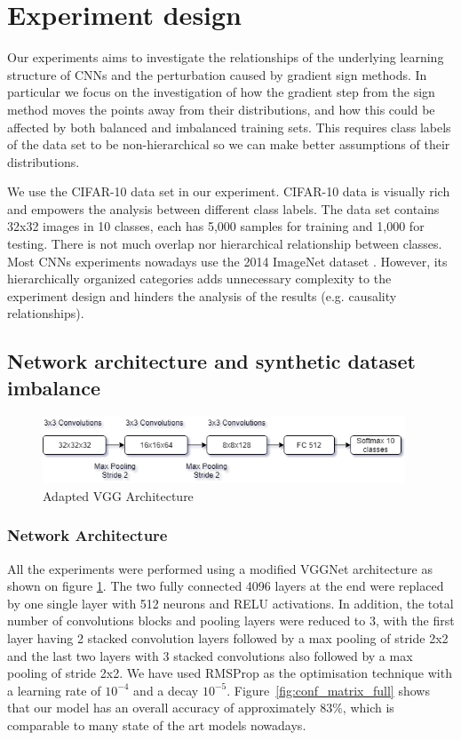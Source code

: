 \documentclass[runningheads,a4paper]{llncs}
\begin{document}
\section{Experiment design}

Our experiments aims to investigate the relationships of the underlying learning structure of CNNs and the perturbation caused by gradient sign methods. In particular we focus on the investigation of how the gradient step from the sign method moves the points away from their distributions, and how this could be affected by both balanced and imbalanced training sets. This requires  class labels of the data set to be non-hierarchical so we can make better assumptions of their distributions. 

We use the CIFAR-10 data set \cite{krizhevsky_2009} in our experiment. CIFAR-10 data is visually rich and empowers the analysis between different class labels. The data set contains 32x32 images in 10 classes, each has 5,000 samples for training and 1,000 for testing. There is not much overlap nor hierarchical relationship between classes. Most CNNs experiments nowadays use the 2014 ImageNet dataset \cite{deng2009imagenet}. However, its hierarchically organized categories adds unnecessary complexity to the experiment design and hinders the analysis of the results (e.g. causality relationships).
\subsection{Network architecture and synthetic dataset imbalance}
\begin{figure}
	\centering
	\includegraphics[height=2.0cm]{net_diagram.png}
	\caption{Adapted VGG Architecture}
	\label{fig:vgg_arch}
\end{figure}

\subsubsection{Network Architecture} All the experiments were performed using a modified VGGNet \cite{simonyan2014very} architecture as shown on figure \ref{fig:vgg_arch}. The two fully connected 4096 layers at the end were replaced by one single layer with 512 neurons and RELU activations. In addition, the total number of convolutions blocks and pooling layers were reduced to 3, with the first layer having 2 stacked convolution layers followed by a max pooling of stride 2x2 and the last two layers with 3 stacked convolutions also followed by a max pooling of stride 2x2. We have used RMSProp  \cite{bengiormsprop} as the optimisation technique with a learning rate of $10^{-4}$ and a decay $10^{-5}$. Figure~\ref{fig:conf_matrix_full} shows that our model has an overall accuracy of approximately 83\%, which is comparable to many state of the art models nowadays.
\end{document}
